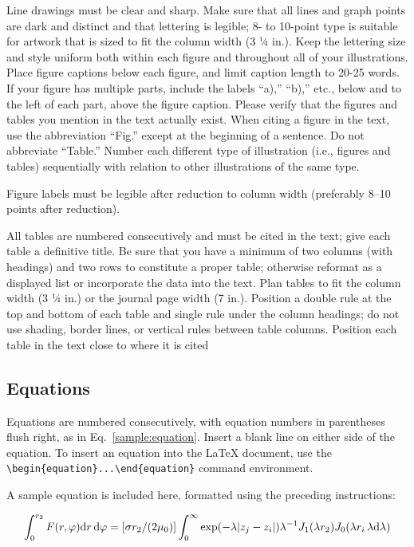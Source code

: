 \documentclass[journal]{new-aiaa}
\begin{document}
Line drawings must be clear and sharp. Make sure that all lines and graph points are dark and distinct and that lettering is legible; 8- to 10-point type is suitable for artwork that is sized to fit the column width (3 ¼ in.). Keep the lettering size and style uniform both within each figure and throughout all of your illustrations. Place figure captions below each figure, and limit caption length to 20-25 words. If your figure has multiple parts, include the labels “a),” “b),” etc., below and to the left of each part, above the figure caption. Please verify that the figures and tables you mention in the text actually exist. When citing a figure in the text, use the abbreviation “Fig.” except at the beginning of a sentence. Do not abbreviate “Table.” Number each different type of illustration (i.e., figures and tables) sequentially with relation to other illustrations of the same type.

Figure labels must be legible after reduction to column width (preferably 8--10 points after reduction).

All tables are numbered consecutively and must be cited in the text; give each table a definitive title. Be sure that you have a minimum of two columns (with headings) and two rows to constitute a proper table; otherwise reformat as a displayed list or incorporate the data into the text. Plan tables to fit the column width (3 ¼ in.) or the journal page width (7 in.). Position a double rule at the top and bottom of each table and single rule under the column headings; do not use shading, border lines, or vertical rules between table columns. Position each table in the text close to where it is cited


\subsection{Equations}
Equations are numbered consecutively, with equation numbers in parentheses flush right, as in Eq.~\eqref{sample:equation}. Insert a blank line on either side of the equation. To insert an equation into the \LaTeX{} document, use the \verb|\begin{equation}...\end{equation}| command environment.

A sample equation is included here, formatted using the preceding instructions:

\begin{equation}
\label{sample:equation}
\int^{r_2}_0 F(r,\varphi){\rm d}r\,{\rm d}\varphi = [\sigma r_2/(2\mu_0)]\int^{\infty}_0\exp(-\lambda|z_j-z_i|)\lambda^{-1}J_1 (\lambda r_2)J_0 (\lambda r_i\,\lambda {\rm d}\lambda)
\end{equation}
\end{document}
